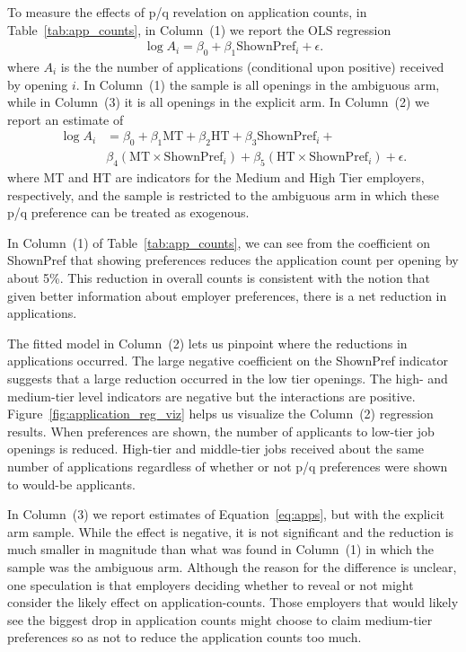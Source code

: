 \documentclass[prodmode,acmec]{ec-acmsmall}
\newcommand{\important}[1]{#1}
\newcommand{\quantclaim}[1]{#1}
\begin{document}
To measure the effects of p/q revelation on application counts, in Table~\ref{tab:app_counts}, in Column~(1) we report the OLS regression 
\begin{align} \label{eq:apps}
\log A_i = \beta_0 + \beta_1 \mbox{ShownPref}_i + \epsilon. 
\end{align} 
where $A_i$ is the the number of applications (conditional upon positive) received by opening $i$.
In Column~(1) the sample is all openings in the ambiguous arm, while in Column~(3) it is all openings in the explicit arm.
In Column~(2) we report an estimate of 
\begin{align} \label{eq:appsi}
\log A_{i} & = \beta_0 + \beta_1 \mbox{MT} + \beta_2 \mbox{HT} + \beta_3 \mbox{ShownPref}_i + \nonumber\\  
          & \beta_4 \left(\mbox{MT} \times \mbox{ShownPref}_i \right) + 
            \beta_5 \left(\mbox{HT} \times \mbox{ShownPref}_i\right) + \epsilon.  
\end{align}
where MT and HT are indicators for the Medium and High Tier employers, respectively, and the sample is restricted to the ambiguous arm in which these p/q preference can be treated as exogenous.

\quantclaim{In Column~(1) of Table~\ref{tab:app_counts}, we can see from the coefficient on ShownPref that showing preferences reduces the application count per opening by about 5\%.}
This reduction in overall counts is consistent with the notion that given better information about employer preferences, there is a net reduction in applications.

The fitted model in Column~(2) lets us pinpoint where the reductions in applications occurred.
The large negative coefficient on the ShownPref indicator suggests that a large reduction occurred in the low tier openings.
The high- and medium-tier level indicators are negative but the interactions are positive.
Figure~\ref{fig:application_reg_viz} helps us visualize the Column~(2) regression results.
\important{When preferences are shown, the number of applicants to low-tier job openings is reduced.  
  High-tier and middle-tier jobs received about the same number of applications regardless of whether or not p/q preferences were shown to would-be applicants.
} 

In Column~(3) we report estimates of Equation~\ref{eq:apps}, but with the explicit arm sample.
While the effect is negative, it is not significant and the reduction is much smaller in magnitude than what was found in Column~(1) in which the sample was the ambiguous arm.
Although the reason for the difference is unclear, one speculation is that employers deciding whether to reveal or not might consider the likely effect on application-counts.
Those employers that would likely see the biggest drop in application counts might choose to claim medium-tier preferences so as not to reduce the application counts too much. 
\end{document}
